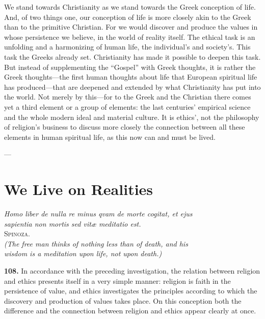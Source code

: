 \documentclass[12pt,a4paper]{book}
\newcommand{\opage}[1]{\marginnote{\footnotesize\textit{[#1]}}}
\begin{document}
We stand towards Christianity as we stand towards the Greek conception of life. And, of two things one, our conception of
life is more closely akin to the Greek than to the primitive Christian. For we would discover and produce the values in
whose persistence we believe, in the world of reality itself. The ethical task is an unfolding and a harmonizing of
human life, the individual's and society's. This task the Greeks already set. Christianity has made it possible to deepen
this task. But instead of supplementing the ``Gospel'' with Greek thoughts, it is rather the Greek thoughts---the first
human thoughts about life that European spiritual life has produced---that are deepened and extended by what Christianity
has put into the world.
Not merely by this---for to the Greek and the Christian there comes yet a third element or a group of elements: the last
centuries' empirical science and the whole modern ideal and material culture. It is ethics', not the philosophy of
religion's business to discuss more closely the connection between all these elements in human spiritual life, as this
now can and must be lived.

\begin{center}---\end{center}

\section{We Live on Realities}
\label{sec:realities}

\begin{flushright}
\opage{238}
\textit{Homo liber de nulla re minus qvam de morte cogitat, et ejus}\\
\textit{sapientia non mortis sed vitæ meditatio est.}\\[2pt]
\textsc{Spinoza}.\\[4pt]
\textit{(The free man thinks of nothing less than of death, and his}\\
\textit{wisdom is a meditation upon life, not upon death.)}
\end{flushright}

\bigskip

\noindent\textbf{108.} In accordance with the preceding investigation, the relation between
religion and ethics presents itself in a very simple manner: religion is faith in the persistence
of value, and ethics investigates the principles according to which the discovery and production
of values takes place. On this conception both the difference and the connection between religion
and ethics appear clearly at once.
\end{document}
